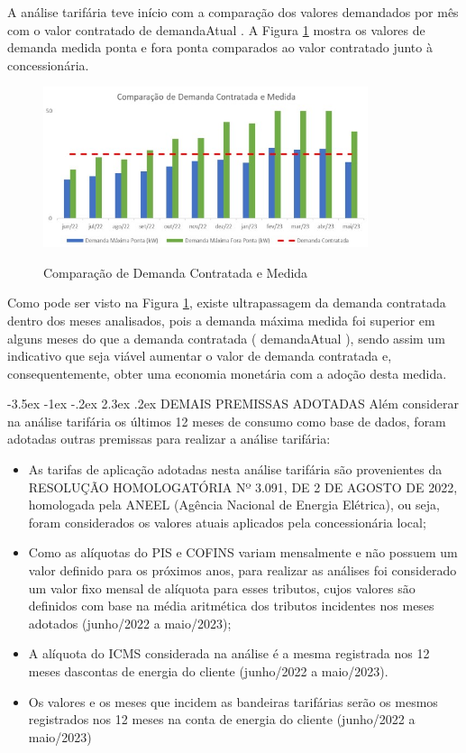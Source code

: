 \documentclass[a4paper,12pt]{abntex2}
\makeatletter
\renewcommand\chapter{\@startsection{chapter}{0}{\z@}%
  {-3.5ex \@plus -1ex \@minus -.2ex}%
  {2.3ex \@plus.2ex}%
  {\normalfont\Large\bfseries}}
\makeatother
\begin{document}
    A análise tarifária teve início com a comparação dos valores demandados por mês com o 
    valor contratado de {{ demandaAtual }}. A Figura \ref{fig:grafico2} mostra os valores de demanda medida ponta e fora 
    ponta comparados ao valor contratado junto à concessionária.

    \begin{figure}[!ht]
        \centering
        \caption{Comparação de Demanda Contratada e Medida}
        \includegraphics[width=0.85\textwidth]{templates/FIGS/grafico2}
        \label{fig:grafico2}
    \end{figure}

Como pode ser visto na Figura \ref{fig:grafico2}, existe ultrapassagem da demanda contratada dentro dos 
meses analisados, pois a demanda máxima medida foi superior em alguns meses  do que a demanda contratada
({{ demandaAtual }}), sendo assim um indicativo que seja viável aumentar  o valor de  demanda  contratada
e,  consequentemente,  obter  uma  economia  monetária  com  a adoção desta medida. 

\chapter{DEMAIS PREMISSAS ADOTADAS}
Além considerar na análise tarifária os últimos 12 meses de consumo como base de dados, 
foram adotadas outras premissas para realizar a análise tarifária:

\begin{itemize}
    \item As  tarifas  de  aplicação  adotadas  nesta  análise  tarifária  são  provenientes  da RESOLUÇÃO HOMOLOGATÓRIA  Nº 3.091, DE 2 DE AGOSTO DE 2022, homologada pela ANEEL (Agência Nacional de Energia Elétrica), ou seja, foram considerados os valores atuais aplicados pela concessionária local;
    \item Como as alíquotas do PIS e COFINS variam mensalmente e não possuem um valor definido  para os  próximos  anos, para  realizar as  análises  foi  considerado um  valor  fixo mensal de alíquota  para esses tributos, cujos valores são definidos com base na média aritmética dos tributos incidentes nos meses adotados (junho/2022 a maio/2023);
    \item A alíquota do ICMS considerada na análise é a mesma registrada nos 12 meses dascontas de energia do cliente (junho/2022 a maio/2023).
    \item Os  valores  e  os  meses  que  incidem  as  bandeiras  tarifárias  serão  os  mesmos registrados nos 12 meses na conta de energia do cliente (junho/2022 a maio/2023)
\end{itemize}
\end{document}
